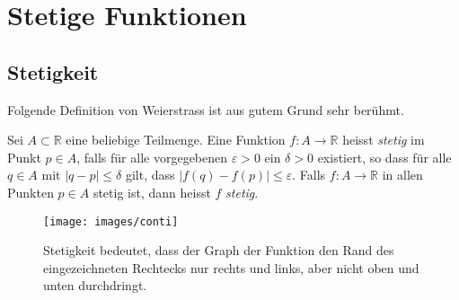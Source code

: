 \documentclass[../main.tex]{subfiles}
\begin{document}
\chapter{Stetige Funktionen}\label{chp:stetig}

\section{Stetigkeit}

Folgende Definition von Weierstrass
ist aus gutem Grund sehr berühmt.

\begin{definition}
  Sei $A \subset \mathbb{R}$ 
  eine beliebige Teilmenge.
  Eine Funktion
  $f \colon A \to \mathbb{R}$ 
  heisst \emph{stetig} im Punkt
  $p \in A$, falls für
  alle vorgegebenen $\varepsilon > 0$
  ein  $\delta > 0$ existiert,
  so dass für alle $q \in A$ 
  mit $|q-p| \leq \delta$ gilt,
  dass $|f(q) - f(p)| \leq \varepsilon$.
  Falls $f \colon A \to \mathbb{R}$ in
  allen Punkten $p \in A$ stetig ist,
  dann heisst $f$ \emph{stetig}.
\end{definition}

\begin{figure}[htb]
  \centering
  \texttt{[image: images/conti]}
  \caption{Stetigkeit bedeutet, dass der Graph
  der Funktion den Rand des eingezeichneten Rechtecks
nur rechts und links, aber nicht oben und unten
durchdringt.}%
  \label{fig:conti}
\end{figure}
\end{document}
